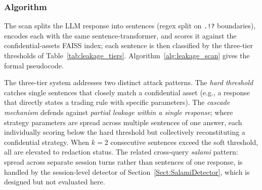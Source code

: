 \documentclass[journal]{IEEEtran}
\begin{document}
\subsubsection{Algorithm}

The scan splits the LLM response into sentences (regex split on \texttt{.!?} boundaries), encodes each with the same sentence-transformer, and scores it against the confidential-assets FAISS index; each sentence is then classified by the three-tier thresholds of Table~\ref{tab:leakage_tiers}. Algorithm~\ref{alg:leakage_scan} gives the formal pseudocode.

\begin{table}[!ht]
    \centering
    \caption{Leakage Scan: Three-Tier Threshold System}
    \label{tab:leakage_tiers}
\end{table}

The three-tier system addresses two distinct attack patterns. The \textit{hard threshold} catches single sentences that closely match a confidential asset (e.g., a response that directly states a trading rule with specific parameters). The \textit{cascade mechanism} defends against \textit{partial leakage within a single response}; where strategy parameters are spread across multiple sentences of one answer, each individually scoring below the hard threshold but collectively reconstituting a confidential strategy. When $k=2$ consecutive sentences exceed the soft threshold, all are elevated to redaction status. The related cross-query \textit{salami} pattern: spread across separate session turns rather than sentences of one response, is handled by the session-level detector of Section~\ref{Sect:SalamiDetector}, which is designed but not evaluated here.
\end{document}

